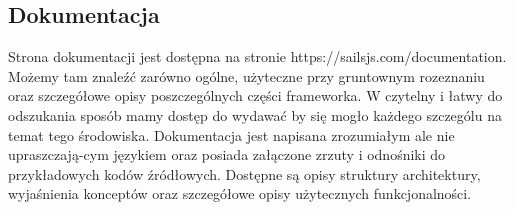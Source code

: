 \documentclass[12pt]{report}
\begin{document}
    \subsection{Dokumentacja}
      Strona dokumentacji jest dostępna na stronie https://sailsjs.com/documentation.
      Możemy tam znaleźć zarówno ogólne, użyteczne przy gruntownym rozeznaniu oraz szczegółowe opisy poszczególnych części frameworka.
      W czytelny i łatwy do odszukania sposób mamy dostęp do wydawać by się mogło każdego szczególu na temat tego środowiska.
      Dokumentacja jest napisana zrozumiałym ale nie upraszczają-cym językiem oraz posiada załączone zrzuty i odnośniki do przykładowych kodów źródłowych.
      Dostępne są opisy struktury architektury, wyjaśnienia konceptów oraz szczegółowe opisy użytecznych funkcjonalności.
      \newline
      \newline
      \newline
      \newline
      \newline
      \newline
      \newline
      \newline
      \newline
      \newline
      \newline
      \newline
      \newline
      \newline
      \newline
      \newline
      \newline
      \newline
      \newline
      \newline
      \newline
      \newline
      \newline
      \newline
      \newline
      \newline
      \newline
      \newline
      \newline
      \newline
      \newline
      \newline
      \newline
\end{document}
